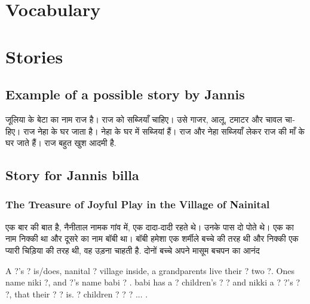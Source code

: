 \documentclass[12pt]{scrartcl}
\begin{document}
\newpage 
\section{Vocabulary}


\section{Stories}
\subsection{Example of a possible story by Jannis}



\begin{hindi}
जूलिया के बेटा का नाम राज है।
राज को सब्जियाँ चाहिए।
उसे गाजर, आलू, टमाटर और चावल चाहिए।
राज नेहा के घर जाता है।
नेहा के घर में सब्जियां हैं।
राज और नेहा सब्जियाँ लेकर राज की माँ के घर जाते हैं।
राज बहुत खुश आदमी है.
\end{hindi}

\subsection{Story for Jannis billa}
\subsubsection{The Treasure of Joyful Play in the Village of Nainital}


\begin{hindi}
एक बार की बात है, नैनीताल नामक गांव में, एक दादा-दादी रहते थे। उनके पास दो पोते थे। एक का नाम निक्की था और दूसरे का नाम बॉबी था। बॉबी हमेशा एक शर्मीले बच्चे की तरह थी और निक्की एक प्यारी चिड़िया की तरह थी, वह उड़ना चाहती है. दोनों बच्चे अपने मासूम बचपन का आनंद \end{hindi}

A ?'s ? is/does, nanital ? village inside, a grandparents live their ? two ?. Ones name niki ?, and ?'s name babi ? . babi has a ? children's ? ? and nikki a ? ?'s ? ?, that their ? ? is. ? children ? ? ? ... . 

\end{document}
